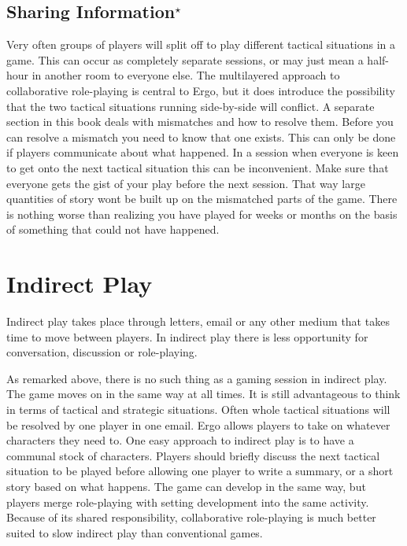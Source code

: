 \documentclass[twoside]{book}
\begin{document}
\subsection{Sharing Information$^\star$} %

Very often groups of players will split off to play different tactical
situations in a game. This can occur as completely separate sessions,
or may just mean a half-hour in another room to everyone else. The
multilayered approach to collaborative role-playing is central to
Ergo, but it does introduce the possibility that the two tactical
situations running side-by-side will conflict. A separate section in
this book deals with mismatches and how to resolve them. Before you
can resolve a mismatch you need to know that one exists. This can only
be done if players communicate about what happened. In a session when
everyone is keen to get onto the next tactical situation this can be
inconvenient. Make sure that everyone gets the gist of your play
before the next session. That way large quantities of story wont be
built up on the mismatched parts of the game. There is nothing worse
than realizing you have played for weeks or months on the basis of
something that could not have happened.

\section{Indirect Play}

Indirect play takes place through letters, email or any other medium
that takes time to move between players. In indirect play there is
less opportunity for conversation, discussion or role-playing.

As remarked above, there is no such thing as a gaming session in
indirect play. The game moves on in the same way at all times. It is
still advantageous to think in terms of tactical and strategic
situations. Often whole tactical situations will be resolved by one
player in one email. Ergo allows players to take on whatever
characters they need to. One easy approach to indirect play is to have
a communal stock of characters. Players should briefly discuss the
next tactical situation to be played before allowing one player to
write a summary, or a short story based on what happens. The game can
develop in the same way, but players merge role-playing with setting
development into the same activity. Because of its shared
responsibility, collaborative role-playing is much better suited to
slow indirect play than conventional games.
\end{document}

